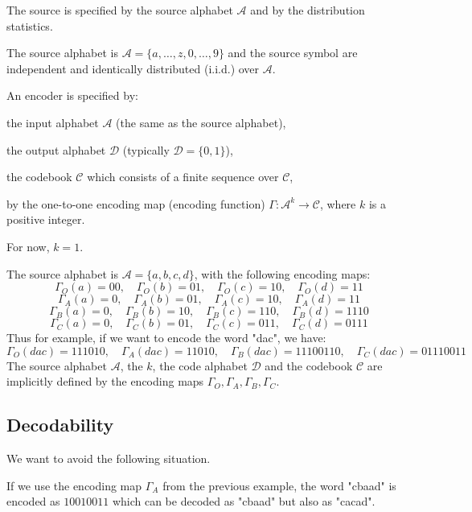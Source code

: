 \begin{definition}[Source]
    The source is specified by the source alphabet $\mathcal{A}$ and by the distribution statistics.
\end{definition}

\begin{eg}
    The source alphabet is $\mathcal{A} = \{a, \ldots, z, 0, \ldots, 9\}$ and the source symbol are independent and identically distributed (i.i.d.) over $\mathcal{A}$.
\end{eg}

\begin{definition}[Encoder]
    An encoder is specified by:
    \begin{citemize}
        \item the input alphabet $\mathcal{A}$ (the same as the source alphabet),
        \item the output alphabet $\mathcal{D}$ (typically $\mathcal{D} = \{0, 1\}$),
        \item the codebook $\mathcal{C}$ which consists of a finite sequence over $\mathcal{C}$,
        \item by the one-to-one encoding map (encoding function) $\Gamma: \mathcal{A}^k \to \mathcal{C}$, where $k$ is a positive integer. 
    \end{citemize}
\end{definition}
For now, $k = 1$.

\begin{eg}
    The source alphabet is $\mathcal{A} = \{a,b,c,d\}$, with the following encoding maps:
    \[
        \Gamma_O(a) = 00, \quad \Gamma_O(b) = 01, \quad \Gamma_O(c) = 10, \quad \Gamma_O(d) = 11
    \]
    \[
        \Gamma_A(a) = 0, \quad \Gamma_A(b) = 01, \quad \Gamma_A(c) = 10, \quad \Gamma_A(d) = 11
    \]
    \[
        \Gamma_B(a) = 0, \quad \Gamma_B(b) = 10, \quad \Gamma_B(c) = 110, \quad \Gamma_B(d) = 1110
    \]
    \[
        \Gamma_C(a) = 0, \quad \Gamma_C(b) = 01, \quad \Gamma_C(c) = 011, \quad \Gamma_C(d) = 0111
    \]
    Thus for example, if we want to encode the word "dac", we have:
    \[
        \Gamma_O(dac) = 111010, \quad \Gamma_A(dac) = 11010, \quad \Gamma_B(dac) = 11100110, \quad \Gamma_C(dac) = 01110011
    \]
    The source alphabet $\mathcal{A}$, the $k$, the code alphabet $\mathcal{D}$ and the codebook $\mathcal{C}$ are implicitly defined by the encoding maps $\Gamma_O, \Gamma_A, \Gamma_B, \Gamma_C$.
\end{eg}

\subsection{Decodability}
We want to avoid the following situation.
\begin{eg}
    If we use the encoding map $\Gamma_A$ from the previous example, the word "cbaad" is encoded as $10010011$ which can be decoded as "cbaad" but also as "cacad". 
\end{eg}

